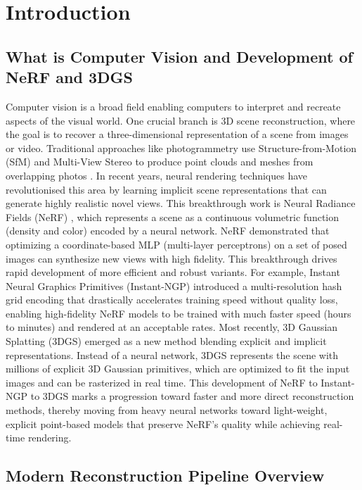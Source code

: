 \documentclass[11pt,a4paper]{article}
\begin{document}
\clearpage
\section{Introduction}

\subsection{What is Computer Vision and Development of NeRF and 3DGS}

Computer vision is a broad field enabling computers to interpret and recreate aspects of the visual world. One crucial branch is 3D scene reconstruction, where the goal is to recover a three-dimensional representation of a scene from images or video. Traditional approaches like photogrammetry use Structure-from-Motion (SfM) and Multi-View Stereo to produce point clouds and meshes from overlapping photos \cite{ref1}. In recent years, neural rendering techniques have revolutionised this area by learning implicit scene representations that can generate highly realistic novel views. This breakthrough work is Neural Radiance Fields (NeRF) \cite{ref2}, which represents a scene as a continuous volumetric function (density and color) encoded by a neural network. NeRF demonstrated that optimizing a coordinate-based MLP (multi-layer perceptrons) on a set of posed images can synthesize new views with high fidelity. This breakthrough drives rapid development of more efficient and robust variants. For example, Instant Neural Graphics Primitives (Instant-NGP) \cite{ref3} introduced a multi-resolution hash grid encoding that drastically accelerates training speed without quality loss, enabling high-fidelity NeRF models to be trained with much faster speed (hours to minutes) and rendered at an acceptable rates. Most recently, 3D Gaussian Splatting (3DGS) \cite{ref4} emerged as a new method blending explicit and implicit representations. Instead of a neural network, 3DGS represents the scene with millions of explicit 3D Gaussian primitives, which are optimized to fit the input images and can be rasterized in real time. This development of NeRF to Instant-NGP to 3DGS marks a progression toward faster and more direct reconstruction methods, thereby moving from heavy neural networks toward light-weight, explicit point-based models that preserve NeRF's quality while achieving real-time rendering.

\subsection{Modern Reconstruction Pipeline Overview}
\end{document}

